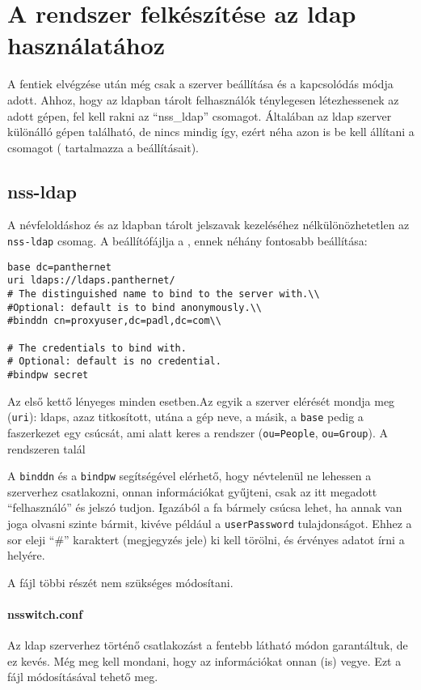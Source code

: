\section{A rendszer felkészítése az ldap használatához}
A fentiek elvégzése után még csak a szerver beállítása és a kapcsolódás módja adott. Ahhoz, hogy az ldapban tárolt
felhasználók ténylegesen létezhessenek az adott gépen, fel kell rakni az ``nss\_ldap'' csomagot. Általában az ldap
szerver különálló gépen található, de nincs mindig így, ezért néha azon is be kell állítani a csomagot
( tartalmazza a beállításait).

\subsection{nss-ldap}
A névfeloldáshoz és az ldapban tárolt jelszavak kezeléséhez nélkülönözhetetlen az \texttt{nss-ldap} csomag. A
beállítófájlja a , ennek néhány fontosabb beállítása:

\begin{Verbatim}[frame=single,label=/etc/ldap.conf részlet]
base dc=panthernet
uri ldaps://ldaps.panthernet/
# The distinguished name to bind to the server with.\\
#Optional: default is to bind anonymously.\\
#binddn cn=proxyuser,dc=padl,dc=com\\
  
# The credentials to bind with.
# Optional: default is no credential.
#bindpw secret
\end{Verbatim}

Az első kettő lényeges minden esetben.Az egyik a szerver elérését mondja meg (\texttt{uri}): ldaps, azaz titkosított,
utána a gép neve, a másik, a \texttt{base} pedig a faszerkezet egy csúcsát, ami alatt keres a rendszer
(\texttt{ou=People}, \texttt{ou=Group}). A rendszeren talál

A \texttt{binddn} és a \texttt{bindpw} segítségével elérhető, hogy névtelenül ne lehessen a szerverhez csatlakozni,
onnan információkat gyűjteni, csak az itt megadott ``felhasználó'' és jelszó tudjon. Igazából a fa bármely csúcsa
lehet, ha annak van joga olvasni szinte bármit, kivéve például a \texttt{userPassword} tulajdonságot. Ehhez a sor
eleji ``\#'' karaktert (megjegyzés jele) ki kell törölni, és érvényes adatot írni a helyére.

A fájl többi részét nem szükséges módosítani.


\paragraph{nsswitch.conf} Az ldap szerverhez történő csatlakozást a fentebb látható módon garantáltuk, de ez
kevés. Még meg kell mondani, hogy az információkat onnan (is) vegye. Ezt a  fájl
módosításával tehető meg.

